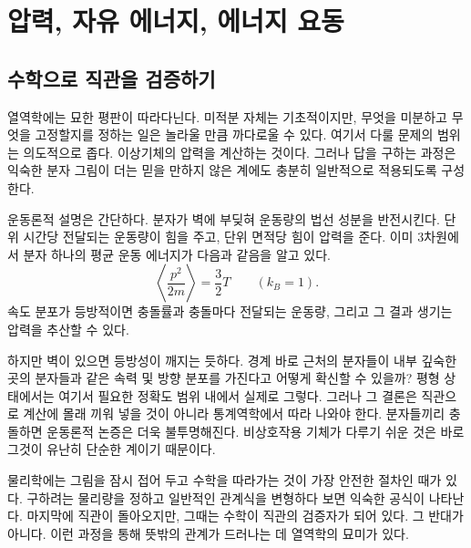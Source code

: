\chapter{압력, 자유 에너지, 에너지 요동}


\section{수학으로 직관을 검증하기}

열역학에는 묘한 평판이 따라다닌다. 미적분 자체는 기초적이지만, 무엇을 미분하고 무엇을 고정할지를 정하는 일은 놀라울 만큼 까다로울 수 있다. 여기서 다룰 문제의 범위는 의도적으로 좁다. 이상기체의 압력을 계산하는 것이다. 그러나 답을 구하는 과정은 익숙한 분자 그림이 더는 믿을 만하지 않은 계에도 충분히 일반적으로 적용되도록 구성한다.

운동론적 설명은 간단하다. 분자가 벽에 부딪혀 운동량의 법선 성분을 반전시킨다. 단위 시간당 전달되는 운동량이 힘을 주고, 단위 면적당 힘이 압력을 준다. 이미 3차원에서 분자 하나의 평균 운동 에너지가 다음과 같음을 알고 있다.
\begin{equation}
 \left\langle \frac{p^2}{2m}\right\rangle=\frac{3}{2}T
 \qquad (k_B=1).
 \label{eq:sm5-mean-kinetic-energy}
\end{equation}
속도 분포가 등방적이면 충돌률과 충돌마다 전달되는 운동량, 그리고 그 결과 생기는 압력을 추산할 수 있다.

하지만 벽이 있으면 등방성이 깨지는 듯하다. 경계 바로 근처의 분자들이 내부 깊숙한 곳의 분자들과 같은 속력 및 방향 분포를 가진다고 어떻게 확신할 수 있을까? 평형 상태에서는 여기서 필요한 정확도 범위 내에서 실제로 그렇다. 그러나 그 결론은 직관으로 계산에 몰래 끼워 넣을 것이 아니라 통계역학에서 따라 나와야 한다. 분자들끼리 충돌하면 운동론적 논증은 더욱 불투명해진다. 비상호작용 기체가 다루기 쉬운 것은 바로 그것이 유난히 단순한 계이기 때문이다.

물리학에는 그림을 잠시 접어 두고 수학을 따라가는 것이 가장 안전한 절차인 때가 있다. 구하려는 물리량을 정하고 일반적인 관계식을 변형하다 보면 익숙한 공식이 나타난다. 마지막에 직관이 돌아오지만, 그때는 수학이 직관의 검증자가 되어 있다. 그 반대가 아니다. 이런 과정을 통해 뜻밖의 관계가 드러나는 데 열역학의 묘미가 있다.

